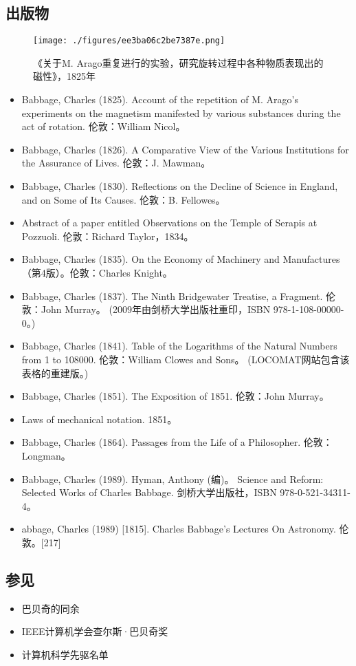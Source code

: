 \subsection{出版物}
\begin{figure}[ht]
\centering
\texttt{[image: ./figures/ee3ba06c2be7387e.png]}
\caption{《关于M. Arago重复进行的实验，研究旋转过程中各种物质表现出的磁性》，1825年} \label{fig_CRSBQ_16}
\end{figure}
\begin{itemize}
\item Babbage, Charles (1825). Account of the repetition of M. Arago's experiments on the magnetism manifested by various substances during the act of rotation. 伦敦：William Nicol。
\item Babbage, Charles (1826). A Comparative View of the Various Institutions for the Assurance of Lives. 伦敦：J. Mawman。
\item Babbage, Charles (1830). Reflections on the Decline of Science in England, and on Some of Its Causes. 伦敦：B. Fellowes。
\item Abstract of a paper entitled Observations on the Temple of Serapis at Pozzuoli. 伦敦：Richard Taylor，1834。
\item Babbage, Charles (1835). On the Economy of Machinery and Manufactures（第4版）。伦敦：Charles Knight。
\item Babbage, Charles (1837). The Ninth Bridgewater Treatise, a Fragment. 伦敦：John Murray。 (2009年由剑桥大学出版社重印，ISBN 978-1-108-00000-0。)
\item Babbage, Charles (1841). Table of the Logarithms of the Natural Numbers from 1 to 108000. 伦敦：William Clowes and Sons。 (LOCOMAT网站包含该表格的重建版。)
\item Babbage, Charles (1851). The Exposition of 1851. 伦敦：John Murray。
\item Laws of mechanical notation. 1851。
\item Babbage, Charles (1864). Passages from the Life of a Philosopher. 伦敦：Longman。
\item Babbage, Charles (1989). Hyman, Anthony (编)。 Science and Reform: Selected Works of Charles Babbage. 剑桥大学出版社，ISBN 978-0-521-34311-4。
\item abbage, Charles (1989) [1815]. Charles Babbage's Lectures On Astronomy. 伦敦。[217]
\end{itemize}
\subsection{参见}
\begin{itemize}
\item 巴贝奇的同余  
\item IEEE计算机学会查尔斯·巴贝奇奖  
\item 计算机科学先驱名单
\end{itemize}
